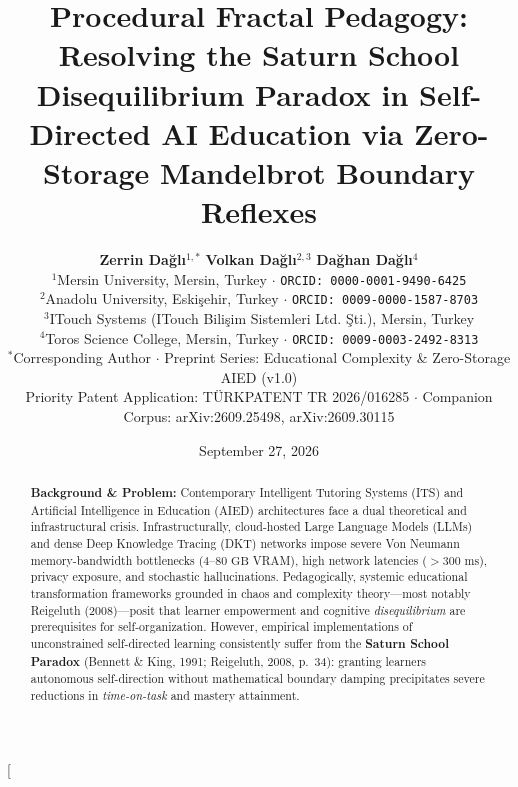 \documentclass[10pt,twocolumn,a4paper]{article}
\title{\textbf{Procedural Fractal Pedagogy: Resolving the Saturn School Disequilibrium Paradox in Self-Directed AI Education via Zero-Storage Mandelbrot Boundary Reflexes}}
\author{
    \textbf{Zerrin Da\u{g}l\i}$^{1,*}$ \quad \textbf{Volkan Da\u{g}l\i}$^{2,3}$ \quad \textbf{Da\u{g}han Da\u{g}l\i}$^{4}$ \\[6pt]
    \small $^{1}$Mersin University, Mersin, Turkey $\cdot$ \texttt{ORCID: 0000-0001-9490-6425} \\
    \small $^{2}$Anadolu University, Eski\c{s}ehir, Turkey $\cdot$ \texttt{ORCID: 0009-0000-1587-8703} \\
    \small $^{3}$ITouch Systems (ITouch Bili\c{s}im Sistemleri Ltd. \c{S}ti.), Mersin, Turkey \\
    \small $^{4}$Toros Science College, Mersin, Turkey $\cdot$ \texttt{ORCID: 0009-0003-2492-8313} \\[4pt]
    \small $^{*}$Corresponding Author $\cdot$ Preprint Series: Educational Complexity \& Zero-Storage AIED (v1.0) \\
    \small Priority Patent Application: T\"URKPATENT TR 2026/016285 $\cdot$ Companion Corpus: arXiv:2609.25498, arXiv:2609.30115
}
\date{September 27, 2026}
\begin{document}
\twocolumn[
  \begin{@twocolumnfalse}
    \maketitle
    \begin{abstract}
      \noindent \textbf{Background \& Problem:} Contemporary Intelligent Tutoring Systems (ITS) and Artificial Intelligence in Education (AIED) architectures face a dual theoretical and infrastructural crisis. Infrastructurally, cloud-hosted Large Language Models (LLMs) and dense Deep Knowledge Tracing (DKT) networks impose severe Von Neumann memory-bandwidth bottlenecks ($4\text{--}80\text{ GB}$ VRAM), high network latencies ($>300\text{ ms}$), privacy exposure, and stochastic hallucinations. Pedagogically, systemic educational transformation frameworks grounded in chaos and complexity theory—most notably Reigeluth (2008)—posit that learner empowerment and cognitive \textit{disequilibrium} are prerequisites for self-organization. However, empirical implementations of unconstrained self-directed learning consistently suffer from the \textbf{Saturn School Paradox} (Bennett \& King, 1991; Reigeluth, 2008, p.~34): granting learners autonomous self-direction without mathematical boundary damping precipitates severe reductions in \textit{time-on-task} and mastery attainment. \\

\end{abstract}
\end{@twocolumnfalse}
\end{document}
